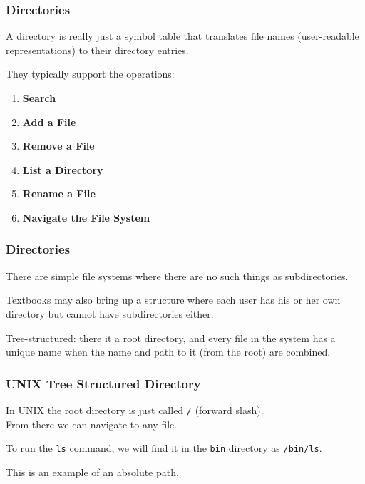 \begin{frame}
\frametitle{Directories}

A directory is really just a symbol table that translates file names (user-readable representations) to their directory entries.

They typically support the operations:

\begin{enumerate}
	\item \textbf{Search}
	\item \textbf{Add a File}
	\item \textbf{Remove a File}
	\item \textbf{List a Directory}
	\item \textbf{Rename a File}
	\item \textbf{Navigate the File System}
\end{enumerate}


\end{frame}

\begin{frame}
\frametitle{Directories}

There are simple file systems where there are no such things as subdirectories.

Textbooks may also bring up a structure where each user has his or her own directory but cannot have subdirectories either. 

Tree-structured: there it a root directory, and every file in the system has a unique name when the name and path to it (from the root) are combined.

\end{frame}

\begin{frame}
\frametitle{UNIX Tree Structured Directory}

In UNIX the root directory is just called \texttt{/} (forward slash).\\
\quad From there we can navigate to any file. 

To run the \texttt{ls} command, we will find it in the \texttt{bin} directory as \texttt{/bin/ls}. 

This is an example of an absolute path.

\end{frame}

